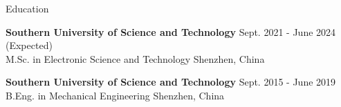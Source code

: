 \documentclass{resume} %
\begin{document}

\begin{rSection}{Education}

{\bf Southern University of Science and Technology} \hfill { Sept. 2021 - June 2024 (Expected)} \\ 
{M.Sc. in Electronic Science and Technology} \hfill {Shenzhen, China}

{\bf Southern University of Science and Technology} \hfill { Sept. 2015 - June 2019} \\ 
{B.Eng. in Mechanical Engineering} \hfill {Shenzhen, China}

\end{rSection}

\end{document}
